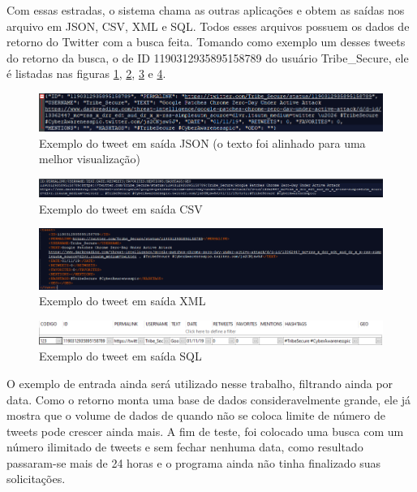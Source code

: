 Com essas estradas, o sistema chama as outras aplicações e obtem as saídas nos arquivo em JSON, CSV, XML e SQL. Todos esses arquivos possuem os dados de retorno do Twitter com a busca feita. Tomando como exemplo um desses tweets do retorno da busca, o de ID 1190312935895158789 do usuário Tribe\_Secure, ele é listadas nas figuras \ref{fig:saidaJson}, \ref{fig:saidaCSV}, \ref{fig:saidaXML} e \ref{fig:saidaSQL}.

\begin{figure}[H]
\centering
\includegraphics[width=1\textwidth]{imagens/saidaJson.png}
\caption{Exemplo do tweet em saída JSON (o texto foi alinhado para uma melhor visualização)}
\label{fig:saidaJson}
\end{figure}

\begin{figure}[H]
\centering
\includegraphics[width=1\textwidth]{imagens/saidaCSV.png}
\caption{Exemplo do tweet em saída CSV}
\label{fig:saidaCSV}
\end{figure}

\begin{figure}[H]
\centering
\includegraphics[width=1\textwidth]{imagens/saidaXML.png}
\caption{Exemplo do tweet em saída XML}
\label{fig:saidaXML}
\end{figure}

\begin{figure}[H]
\centering
\includegraphics[width=1\textwidth]{imagens/saidaSQL.png}
\caption{Exemplo do tweet em saída SQL}
\label{fig:saidaSQL}
\end{figure}

O exemplo de entrada ainda será utilizado nesse trabalho, filtrando ainda por data. Como o retorno monta uma base de dados consideravelmente grande, ele já mostra que o volume de dados de quando não se coloca limite de número de tweets pode crescer ainda mais. A fim de teste, foi colocado uma busca com um número ilimitado de tweets e sem fechar nenhuma data, como resultado passaram-se mais de 24 horas e o programa ainda não tinha finalizado suas solicitações.

